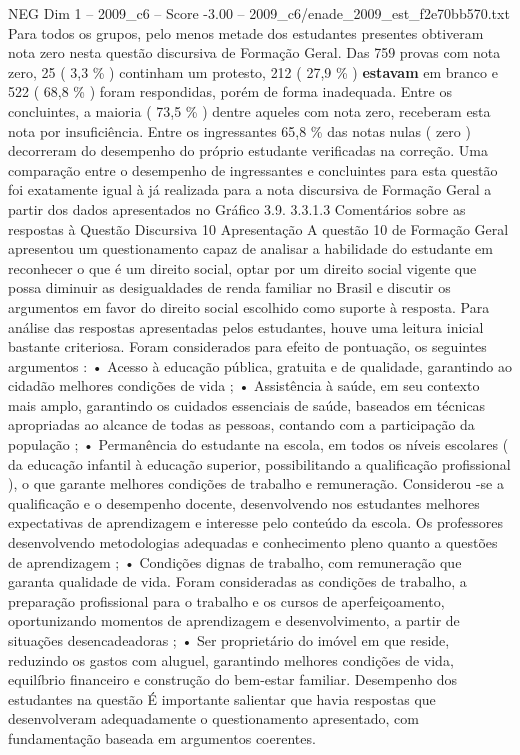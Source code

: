 \begin{textsample}{NEG Dim 1 – 2009\_c6 – Score -3.00 – 2009\_c6/enade\_2009\_est\_f2e70bb570.txt}
Para todos os grupos, pelo menos metade dos estudantes presentes obtiveram nota zero nesta questão discursiva de Formação Geral.
Das 759 provas com nota zero, 25 ( 3,3 \% ) continham um protesto, 212 ( 27,9 \% ) \textbf{estavam} em branco e 522 ( 68,8 \% ) foram respondidas, porém de forma inadequada.
Entre os concluintes, a maioria ( 73,5 \% ) dentre aqueles com nota zero, receberam esta nota por insuficiência.
Entre os ingressantes 65,8 \% das notas nulas ( zero ) decorreram do desempenho do próprio estudante verificadas na correção.
Uma comparação entre o desempenho de ingressantes e concluintes para esta questão foi exatamente igual à já realizada para a nota discursiva de Formação Geral a partir dos dados apresentados no Gráfico 3.9. 3.3.1.3 Comentários sobre as respostas à Questão Discursiva 10 Apresentação A questão 10 de Formação Geral apresentou um questionamento capaz de analisar a habilidade do estudante em reconhecer o que é um direito social, optar por um direito social vigente que possa diminuir as desigualdades de renda familiar no Brasil e discutir os argumentos em favor do direito social escolhido como suporte à resposta.
Para análise das respostas apresentadas pelos estudantes, houve uma leitura inicial bastante criteriosa.
Foram considerados para efeito de pontuação, os seguintes argumentos : • Acesso à educação pública, gratuita e de qualidade, garantindo ao cidadão melhores condições de vida ; • Assistência à saúde, em seu contexto mais amplo, garantindo os cuidados essenciais de saúde, baseados em técnicas apropriadas ao alcance de todas as pessoas, contando com a participação da população ; • Permanência do estudante na escola, em todos os níveis escolares ( da educação infantil à educação superior, possibilitando a qualificação profissional ), o que garante melhores condições de trabalho e remuneração.
Considerou -se a qualificação e o desempenho docente, desenvolvendo nos estudantes melhores expectativas de aprendizagem e interesse pelo conteúdo da escola.
Os professores desenvolvendo metodologias adequadas e conhecimento pleno quanto a questões de aprendizagem ; • Condições dignas de trabalho, com remuneração que garanta qualidade de vida.
Foram consideradas as condições de trabalho, a preparação profissional para o trabalho e os cursos de aperfeiçoamento, oportunizando momentos de aprendizagem e desenvolvimento, a partir de situações desencadeadoras ; • Ser proprietário do imóvel em que reside, reduzindo os gastos com aluguel, garantindo melhores condições de vida, equilíbrio financeiro e construção do bem-estar familiar.
Desempenho dos estudantes na questão É importante salientar que havia respostas que desenvolveram adequadamente o questionamento apresentado, com fundamentação baseada em argumentos coerentes.

\end{textsample}
